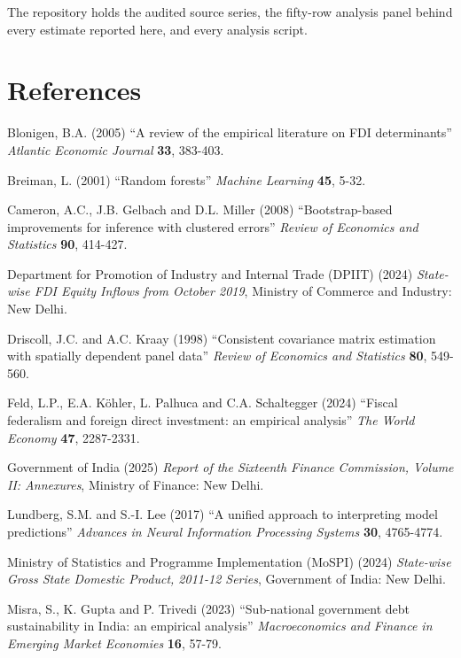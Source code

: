 \documentclass[12pt]{article}
\begin{document}
The repository holds the audited source series, the fifty-row analysis panel
behind every estimate reported here, and every analysis script.

\section*{References}
\small

\hangindent=0.5in
Blonigen, B.A. (2005) ``A review of the empirical literature on FDI determinants'' \textit{Atlantic Economic Journal} \textbf{33}, 383-403.

\hangindent=0.5in
Breiman, L. (2001) ``Random forests'' \textit{Machine Learning} \textbf{45}, 5-32.

\hangindent=0.5in
Cameron, A.C., J.B. Gelbach and D.L. Miller (2008) ``Bootstrap-based improvements for inference with clustered errors'' \textit{Review of Economics and Statistics} \textbf{90}, 414-427.

\hangindent=0.5in
Department for Promotion of Industry and Internal Trade (DPIIT) (2024) \textit{State-wise FDI Equity Inflows from October 2019}, Ministry of Commerce and Industry: New Delhi.

\hangindent=0.5in
Driscoll, J.C. and A.C. Kraay (1998) ``Consistent covariance matrix estimation with spatially dependent panel data'' \textit{Review of Economics and Statistics} \textbf{80}, 549-560.

\hangindent=0.5in
Feld, L.P., E.A. Köhler, L. Palhuca and C.A. Schaltegger (2024) ``Fiscal federalism and foreign direct investment: an empirical analysis'' \textit{The World Economy} \textbf{47}, 2287-2331.

\hangindent=0.5in
Government of India (2025) \textit{Report of the Sixteenth Finance Commission, Volume II: Annexures}, Ministry of Finance: New Delhi.

\hangindent=0.5in
Lundberg, S.M. and S.-I. Lee (2017) ``A unified approach to interpreting model predictions'' \textit{Advances in Neural Information Processing Systems} \textbf{30}, 4765-4774.

\hangindent=0.5in
Ministry of Statistics and Programme Implementation (MoSPI) (2024) \textit{State-wise Gross State Domestic Product, 2011-12 Series}, Government of India: New Delhi.

\hangindent=0.5in
Misra, S., K. Gupta and P. Trivedi (2023) ``Sub-national government debt sustainability in India: an empirical analysis'' \textit{Macroeconomics and Finance in Emerging Market Economies} \textbf{16}, 57-79.
\end{document}
